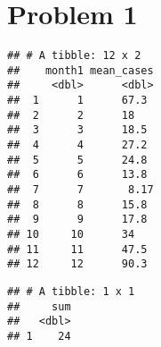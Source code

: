 \documentclass[]{article}
\newenvironment{Shaded}{\begin{snugshade}}{\end{snugshade}}
\newcommand{\KeywordTok}[1]{\textcolor[rgb]{0.13,0.29,0.53}{\textbf{#1}}}
\newcommand{\DataTypeTok}[1]{\textcolor[rgb]{0.13,0.29,0.53}{#1}}
\newcommand{\DecValTok}[1]{\textcolor[rgb]{0.00,0.00,0.81}{#1}}
\newcommand{\StringTok}[1]{\textcolor[rgb]{0.31,0.60,0.02}{#1}}
\newcommand{\OperatorTok}[1]{\textcolor[rgb]{0.81,0.36,0.00}{\textbf{#1}}}
\newcommand{\NormalTok}[1]{#1}
\begin{document}
\section{Problem 1}\label{problem-1}

\begin{Shaded}
\end{Shaded}

\begin{verbatim}
## # A tibble: 12 x 2
##    month1 mean_cases
##     <dbl>      <dbl>
##  1      1      67.3 
##  2      2      18   
##  3      3      18.5 
##  4      4      27.2 
##  5      5      24.8 
##  6      6      13.8 
##  7      7       8.17
##  8      8      15.8 
##  9      9      17.8 
## 10     10      34   
## 11     11      47.5 
## 12     12      90.3
\end{verbatim}

\begin{Shaded}
\end{Shaded}

\begin{verbatim}
## # A tibble: 1 x 1
##     sum
##   <dbl>
## 1    24
\end{verbatim}
\end{document}

